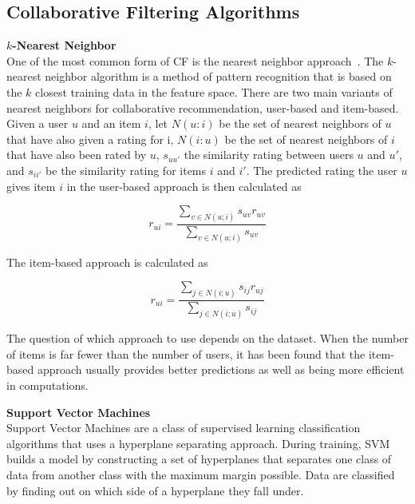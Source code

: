 \subsection{Collaborative Filtering Algorithms}

{\bf $k$-Nearest Neighbor}
\\

One of the most common form of CF is the nearest neighbor approach~\cite{bellkor}. The $k$-nearest neighbor algorithm is a method of pattern recognition that is based on the $k$ closest training data in the feature space. There are two main variants of nearest neighbors for collaborative recommendation, user-based and item-based. Given a user $u$ and an item $i$, let $N(u:i)$ be the set of nearest neighbors of $u$ that have also given a rating for i, $N(i:u)$ be the set of nearest neighbors of $i$ that have also been rated by $u$, $s_{uu'}$ the similarity rating between users $u$ and $u'$, and $s_{ii'}$ be the similarity rating for items $i$ and $i'$. The predicted rating the user $u$ gives item $i$ in the user-based approach is then calculated as

\[
r_{ui} = \frac    {\sum_{v\in N(u;i)} {s_{uv}r_{uv}} } {\sum_{v\in N(u;i)}{s_{uv}}}
\]

The item-based approach is calculated as 

\[
r_{ui} = \frac    {\sum_{j\in N(i;u)} {s_{ij}r_{uj}} } {\sum_{j\in N(i;u)}{s_{ij}}}
\]

The question of which approach to use depends on the dataset. When the number of items is far fewer than the number of users, it has been found that the item-based approach usually provides better predictions as well as being more efficient in computations. 
\\

\begin{comment}
This applies to the MovieLens 1 Million dataset as well. For the MovieLens 100,000 dataset, the number of items is larger than the number of users, and the user-based approach has been found to perform better.
\end{comment}


{\bf Support Vector Machines}
\\

Support Vector Machines are a class of supervised learning classification algorithms that uses a hyperplane separating approach. During training, SVM builds a model by constructing a set of hyperplanes that separates one class of data from another class with the maximum margin possible. Data are classified by finding out on which side of a hyperplane they fall under.

